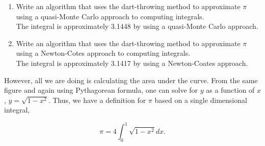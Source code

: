 \documentclass{article}
\begin{document}
\begin{enumerate} 

\item Write an algorithm that uses the dart-throwing method to approximate $\pi$ using a quasi-Monte Carlo approach to computing integrals. \\[1em]

The integral is approximately 3.1448 by using a quasi-Monte Carlo approach. \\[1em]

\item Write an algorithm that uses the dart-throwing method to approximate $\pi$ using a Newton-Cotes approach to computing integrals. \\[1em]

The integral is approximately 3.1417 by using a  Newton-Coates approach. \\[1em]

\end{enumerate}

However, all we are doing is calculating the area under the curve. From the same figure and again using Pythagorean formula, one can solve for $y$ as a function of $x$, $y = \sqrt{1 - x^2}$. Thus, we have a definition for $\pi$ based on a single dimensional integral, 

$$ \pi = 4 \int_0^1 \sqrt{1 - x^2} dx .$$
\end{document}
